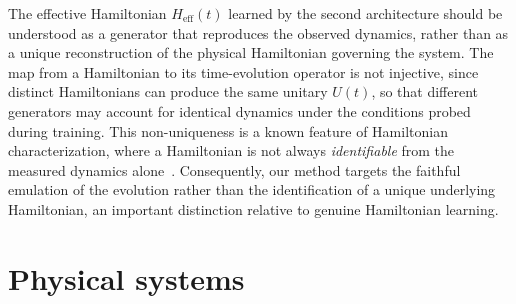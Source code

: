 The effective Hamiltonian $H_\mathrm{eff}(t)$ learned by the second architecture should be understood as a generator that reproduces the observed dynamics, rather than as a unique reconstruction of the physical Hamiltonian governing the system. The map from a Hamiltonian to its time-evolution operator is not injective, since distinct Hamiltonians can produce the same unitary $U(t)$, so that different generators may account for identical dynamics under the conditions probed during training. This non-uniqueness is a known feature of Hamiltonian characterization, where a Hamiltonian is not always \emph{identifiable} from the measured dynamics alone~\cite{sone2017identifiability, zhang2014identification}. Consequently, our method targets the faithful emulation of the evolution rather than the identification of a unique underlying Hamiltonian, an important distinction relative to genuine Hamiltonian learning.

\section{Physical systems}
\label{sec:res-systems}


